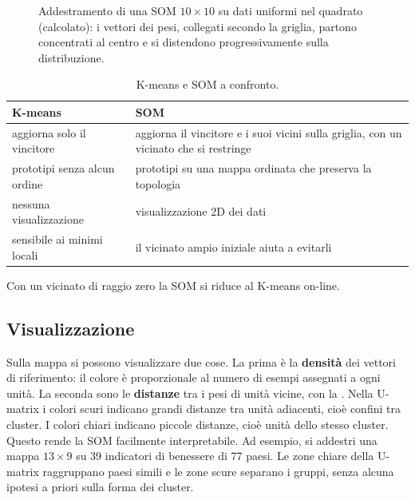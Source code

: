 \begin{figure}[ht]
\centering
{}
\caption{Addestramento di una SOM $10\times10$ su dati uniformi nel quadrato (calcolato): i vettori dei pesi, collegati
secondo la griglia, partono concentrati al centro e si distendono progressivamente sulla distribuzione.}
\label{fig:som-training}
\end{figure}

\begin{table}[ht]
\centering\small
\caption{K-means e SOM a confronto.}
\begin{tabularx}{0.95\linewidth}{XX}
\toprule
K-means & SOM \\
\midrule
aggiorna solo il vincitore & aggiorna il vincitore e i suoi vicini sulla griglia, con un vicinato che si restringe \\
prototipi senza alcun ordine & prototipi su una mappa ordinata che preserva la topologia \\
nessuna visualizzazione & visualizzazione 2D dei dati \\
sensibile ai minimi locali & il vicinato ampio iniziale aiuta a evitarli \\
\bottomrule
\end{tabularx}
\end{table}
Con un vicinato di raggio zero la SOM si riduce al K-means on-line.

\subsection{Visualizzazione}

Sulla mappa si possono visualizzare due cose. La prima è la \textbf{densità} dei vettori di riferimento: il colore è
proporzionale al numero di esempi assegnati a ogni unità. La seconda sono le \textbf{distanze} tra i pesi di unità
vicine, con la . Nella U-matrix i colori scuri indicano grandi distanze tra unità adiacenti, cioè
confini tra cluster. I colori chiari indicano piccole distanze, cioè unità dello stesso cluster. Questo rende la
SOM facilmente interpretabile. Ad esempio, si addestri una mappa $13\times9$ su 39 indicatori di benessere di 77
paesi. Le zone chiare della U-matrix raggruppano paesi simili e le zone scure separano i gruppi, senza alcuna
ipotesi a priori sulla forma dei cluster.

